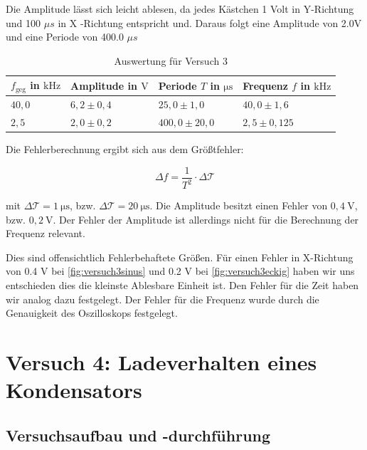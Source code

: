         Die Amplitude lässt sich leicht ablesen, da jedes Kästchen 1 Volt in Y-Richtung und 100 $\mu s$ in X -Richtung entspricht und. Daraus folgt eine Amplitude von 2.0V und eine Periode von 400.0 $\mu s$
        
        \begin{table}[H]
            \centering
            \caption{Auswertung für Versuch 3}
            \begin{tabular}{|l|l|l|l|}
                \hline
                $f_{\mathrm{geg}}$ in $\mathrm{kHz}$ & Amplitude in $\mathrm{V}$ & Periode $T$ in $\mathrm{\mu s}$ & Frequenz $f$ in $\mathrm{kHz}$\\
                \hline\hline
                $40,0$ & $6,2 \pm 0,4$ & $25,0 \pm 1,0$ & $40,0 \pm 1,6$\\
                \hline
                $2,5$ & $2,0 \pm 0,2$ & $400,0 \pm 20,0$ & $2,5 \pm 0,125$\\
                \hline
            \end{tabular}
            \label{tab:versuch3}
        \end{table}

        Die Fehlerberechnung ergibt sich aus dem Größtfehler:

        \begin{equation}
            \Delta f = \frac{1}{T^2} \cdot \Delta \mathcal{T}
            \label{eq:größtfehler}
        \end{equation}

        mit $\Delta \mathcal{T} = 1\ \mathrm{\mu s}$, bzw. $\Delta \mathcal{T} = 20\ \mathrm{\mu s}$. Die Amplitude besitzt einen Fehler von $0,4\ \mathrm{V}$, bzw. $0,2\ \mathrm{V}$. Der Fehler der Amplitude ist allerdings nicht für die Berechnung der Frequenz relevant.

        Dies sind offensichtlich Fehlerbehaftete Größen. Für einen Fehler in X-Richtung von 0.4 V bei \ref{fig:versuch3sinus} und 0.2 V bei \ref{fig:versuch3eckig} haben wir uns entschieden dies die kleinste Ablesbare Einheit ist. Den Fehler für die Zeit haben wir analog dazu festgelegt. Der Fehler für die Frequenz wurde durch die Genauigkeit des Oszilloskops festgelegt.

\section{Versuch 4: Ladeverhalten eines Kondensators}

    \subsection{Versuchsaufbau und -durchführung}

